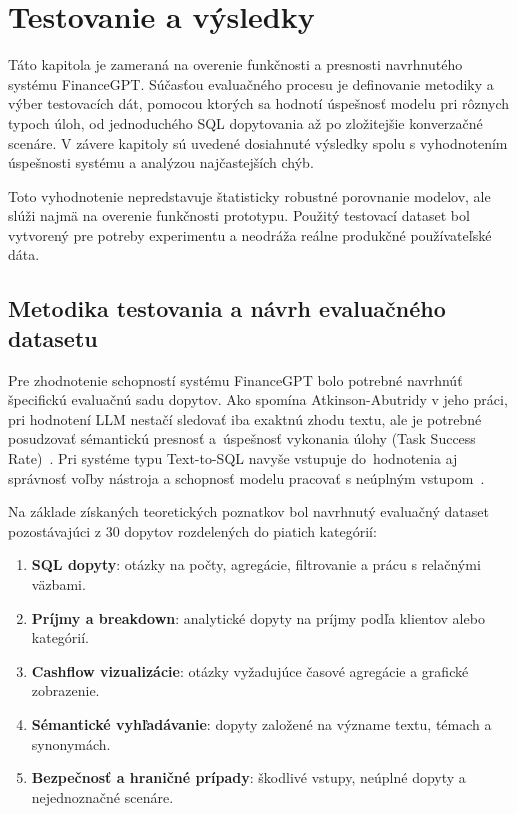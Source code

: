 \section{Testovanie a výsledky}

Táto kapitola je zameraná na overenie funkčnosti a presnosti navrhnutého systému
FinanceGPT. Súčasťou evaluačného procesu je definovanie metodiky a výber testovacích
dát, pomocou ktorých sa hodnotí úspešnosť modelu pri rôznych typoch úloh, od jednoduchého
SQL dopytovania až po zložitejšie konverzačné scenáre. V závere kapitoly sú
uvedené dosiahnuté výsledky spolu s vyhodnotením úspešnosti systému a analýzou
najčastejších chýb.

Toto vyhodnotenie nepredstavuje štatisticky robustné porovnanie modelov, ale slúži
najmä na overenie funkčnosti prototypu. Použitý testovací dataset bol vytvorený
pre potreby experimentu a neodráža reálne produkčné používateľské dáta.

\subsection{Metodika testovania a návrh evaluačného datasetu}

Pre zhodnotenie schopností systému FinanceGPT bolo potrebné navrhnúť špecifickú evaluačnú
sadu dopytov. Ako spomína Atkinson-Abutridy v jeho práci, pri hodnotení LLM nestačí
sledovať iba exaktnú zhodu textu, ale je potrebné posudzovať sémantickú presnosť
a~úspešnosť vykonania úlohy (Task Success Rate)~\cite{atkinson2025}. Pri systéme typu
Text-to-SQL navyše vstupuje do~hodnotenia aj správnosť voľby nástroja a schopnosť
modelu pracovať s neúplným vstupom~\cite{zhao2023}.

Na základe získaných teoretických poznatkov bol navrhnutý evaluačný dataset pozostávajúci
z 30 dopytov rozdelených do piatich kategórií:
\begin{enumerate}
	\item \textbf{SQL dopyty}: otázky na počty, agregácie, filtrovanie a prácu s relačnými
		väzbami.

	\item \textbf{Príjmy a breakdown}: analytické dopyty na príjmy podľa klientov alebo
		kategórií.

	\item \textbf{Cashflow vizualizácie}: otázky vyžadujúce časové agregácie a grafické
		zobrazenie.

	\item \textbf{Sémantické vyhľadávanie}: dopyty založené na význame textu,
		témach a synonymách.

	\item \textbf{Bezpečnosť a hraničné prípady}: škodlivé vstupy, neúplné dopyty
		a nejednoznačné scenáre.
\end{enumerate}


